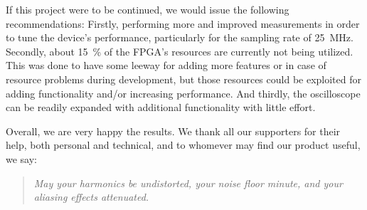 If  this  project  were  to  be   continued,  we  would  issue  the  following
recommendations: Firstly, performing  more and improved measurements  in order
to  tune the  device's  performance,  particularly for  the  sampling rate  of
\SI{25}{\MHz}.  Secondly, about \SI{15}{\percent}  of the FPGA's resources are
currently not  being utilized.  This was  done to have some  leeway for adding
more features  or in case of  resource problems during development,  but those
resources  could  be  exploited  for adding  functionality  and/or  increasing
performance. And  thirdly,  the  oscilloscope  can be  readily  expanded  with
additional functionality with little effort.

Overall, we are very happy the  results. We thank all our supporters for their
help,  both personal  and  technical, and  to whomever  may  find our  product
useful, we say:
\begin{quote}
\centering
\emph{%
    May  your harmonics  be undistorted,  your  noise floor  minute, and  your
    aliasing effects attenuated.%
}
\end{quote}
